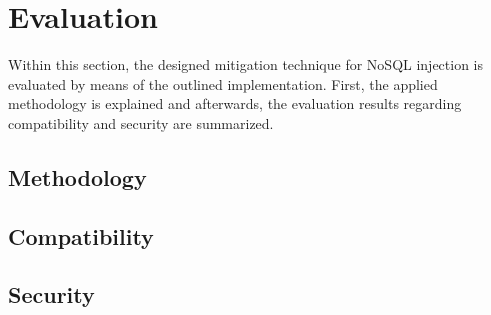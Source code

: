 \section{Evaluation}
\label{sec:evaluation}
Within this section, the designed mitigation technique for NoSQL injection is evaluated by means of the outlined implementation. First, the applied methodology is explained and afterwards, the evaluation results regarding compatibility and security are summarized.

\subsection{Methodology}

\subsection{Compatibility}

\subsection{Security}
